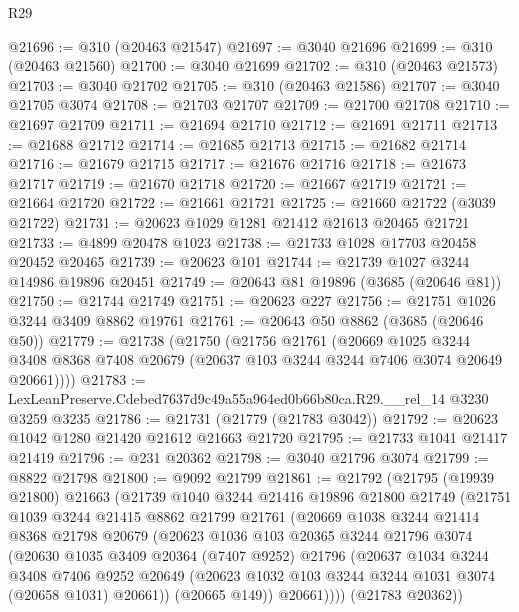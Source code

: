 \begin{lexlean}{R29}
\begin{coremodule}
@21696 := @310 (@20463 @21547)
@21697 := @3040 @21696
@21699 := @310 (@20463 @21560)
@21700 := @3040 @21699
@21702 := @310 (@20463 @21573)
@21703 := @3040 @21702
@21705 := @310 (@20463 @21586)
@21707 := @3040 @21705 @3074
@21708 := @21703 @21707
@21709 := @21700 @21708
@21710 := @21697 @21709
@21711 := @21694 @21710
@21712 := @21691 @21711
@21713 := @21688 @21712
@21714 := @21685 @21713
@21715 := @21682 @21714
@21716 := @21679 @21715
@21717 := @21676 @21716
@21718 := @21673 @21717
@21719 := @21670 @21718
@21720 := @21667 @21719
@21721 := @21664 @21720
@21722 := @21661 @21721
@21725 := @21660 @21722 (@3039 @21722)
@21731 := @20623 @1029 @1281 @21412 @21613 @20465 @21721
@21733 := @4899 @20478 @1023
@21738 := @21733 @1028 @17703 @20458 @20452 @20465
@21739 := @20623 @101
@21744 := @21739 @1027 @3244 @14986 @19896 @20451
@21749 := @20643 @81 @19896 (@3685 (@20646 @81))
@21750 := @21744 @21749
@21751 := @20623 @227
@21756 := @21751 @1026 @3244 @3409 @8862 @19761
@21761 := @20643 @50 @8862 (@3685 (@20646 @50))
@21779 := @21738
    (@21750
      (@21756
        @21761
        (@20669
          @1025
          @3244
          @3408
          @8368
          @7408
          @20679
          (@20637 @103 @3244 @3244 @7406 @3074 @20649 @20661))))
@21783 := LexLeanPreserve.Cdebed7637d9c49a55a964ed0b66b80ca.R29.__rel_14 @3230 @3259 @3235
@21786 := @21731 (@21779 (@21783 @3042))
@21792 := @20623 @1042 @1280 @21420 @21612 @21663 @21720
@21795 := @21733 @1041 @21417 @21419
@21796 := @231 @20362
@21798 := @3040 @21796 @3074
@21799 := @8822 @21798
@21800 := @9092 @21799
@21861 := @21792
    (@21795
      (@19939 @21800)
      @21663
      (@21739
        @1040
        @3244
        @21416
        @19896
        @21800
        @21749
        (@21751
          @1039
          @3244
          @21415
          @8862
          @21799
          @21761
          (@20669
            @1038
            @3244
            @21414
            @8368
            @21798
            @20679
            (@20623
              @1036
              @103
              @20365
              @3244
              @21796
              @3074
              (@20630
                @1035
                @3409
                @20364
                (@7407 @9252)
                @21796
                (@20637
                  @1034
                  @3244
                  @3408
                  @7406
                  @9252
                  @20649
                  (@20623 @1032 @103 @3244 @3244 @1031 @3074 (@20658 @1031) @20661))
                (@20665 @149))
              @20661))))
      (@21783 @20362))

\end{coremodule}
\end{lexlean}
